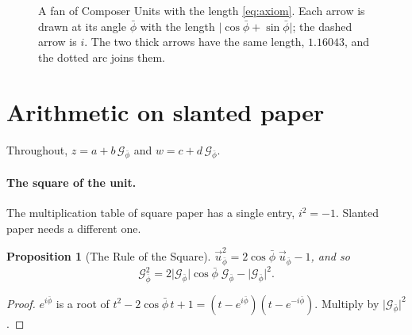 \documentclass[11pt,a4paper]{article}
\theoremstyle{plain}
\newtheorem{proposition}[theorem]{Proposition}
\theoremstyle{definition}
\newcommand{\pb}{\bar{\phi}}                     %
\newcommand{\Gp}{\mathcal{G}_{\bar{\phi}}}       %
\newcommand{\up}{\vec{u}_{\bar{\phi}}}           %
\newcommand{\G}{\lvert\Gp\rvert}                 %
\begin{document}
\begin{figure}[tb]
\centering
{}
\caption{A fan of Composer Units with the length \eqref{eq:axiom}. Each arrow is drawn at its angle $\pb$ with the length $\lvert\cos\pb + \sin\pb\rvert$; the dashed arrow is $i$. The two thick arrows have the same length, $1.16043$, and the dotted arc joins them.}
\label{fig:fan}
\end{figure}

\section{Arithmetic on slanted paper}

Throughout, $z = a + b\,\Gp$ and $w = c + d\,\Gp$.

\paragraph{The square of the unit.} The multiplication table of square paper has a single entry, $i^2 = -1$. Slanted paper needs a different one.

\begin{proposition}[The Rule of the Square]\label{prop:square}
$\up^2 = 2\cos\pb\;\up - 1$, and so
\[
\Gp^2 = 2\G\cos\pb\;\Gp - \G^2 .
\]
\end{proposition}

\begin{proof}
$e^{i\pb}$ is a root of $t^2 - 2\cos\pb\,t + 1 = (t - e^{i\pb})(t - e^{-i\pb})$. Multiply by $\G^2$.
\end{proof}
\end{document}

